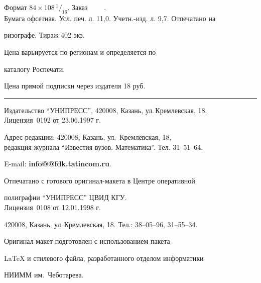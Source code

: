 Формат $84\times 108 \,^1/_{16}.$ Заказ $\qquad$.\\


Бумага офсетная. Усл. печ. л. 11,0. Учетн.-изд. л. 9,7. Отпечатано на 


ризографе. Тираж 402 экз. 





\noindent Цена варьируется по регионам и определяется по 


каталогу Роспечати. 





\noindent Цена прямой подписки через издателя 18 руб. 


\bigskip


\hrule


\bigskip


\noindent Издательство ``УНИПРЕСС'', 420008, Казань, ул.\,Кремлевская, 18.\\


Лицензия \No\,0192 от 23.06.1997 г.


\smallskip


\noindent Адрес редакции: 420008, Казань, ул.~Кремлевская, 18,\\  


редакция журнала  ``Известия вузов. Математика''. Тел. 31--51--64.





\noindent E-mail: {\bf info@@fdk.tatincom.ru}. \par


\bigskip 


\noindent Отпечатано с готового оригинал-макета в Центре оперативной


полиграфии ``УНИПРЕСС'' ЦВИД КГУ. \\


Лицензия \No\,0108 от 12.01.1998 г.


420008, Казань, ул.\,Кремлевская, 18. Тел.: 38--05--96, 31--55--34. \par


\bigskip


\noindent Оригинал-макет подготовлен с использованием пакета


\AmS\LaTeX{} и стилевого файла, разработанного отделом информатики


НИИММ им.~Чеботарева.








